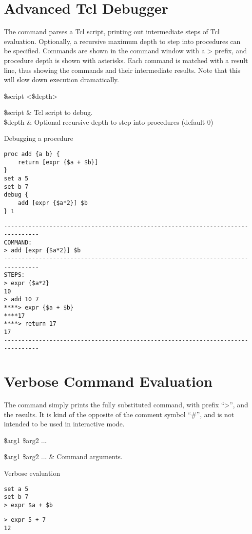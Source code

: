 \documentclass{article}
\renewcommand{\^}[1]{\textsuperscript{#1}}
\renewcommand{\_}[1]{\textsubscript{#1}}
\begin{document}
\section{Advanced Tcl Debugger}
The  command parses a Tcl script, printing out intermediate steps of Tcl evaluation. Optionally, a recursive maximum depth to step into procedures can be specified. Commands are shown in the command window with a > prefix, and procedure depth is shown with asterisks. Each command is matched with a result line, thus showing the commands and their intermediate results. Note that this will slow down execution dramatically.
\begin{syntax}
 \$script <\$depth>
\end{syntax}
\begin{args}
\$script & Tcl script to debug. \\
\$depth & Optional recursive depth to step into procedures (default 0)
\end{args}

\begin{example}{Debugging a procedure}
\begin{lstlisting}
proc add {a b} {
    return [expr {$a + $b}]
}
set a 5
set b 7
debug {
    add [expr {$a*2}] $b
} 1
\end{lstlisting}
\tcblower
\begin{lstlisting}
--------------------------------------------------------------------------------
COMMAND:
> add [expr {$a*2}] $b
--------------------------------------------------------------------------------
STEPS:
> expr {$a*2}
10
> add 10 7
****> expr {$a + $b}
****17
****> return 17
17
--------------------------------------------------------------------------------
\end{lstlisting}
\end{example}
\clearpage
\section{Verbose Command Evaluation}
The command \cmdlink{>} simply prints the fully substituted command, with prefix ``>'', and the results.
It is kind of the opposite of the comment symbol ``\#'', and is not intended to be used in interactive mode.
\begin{syntax}
\command{>} \$arg1 \$arg2 ...
\end{syntax}
\begin{args}
\$arg1 \$arg2 ... & Command arguments.
\end{args}
\begin{example}{Verbose evaluation}
\begin{lstlisting}
set a 5
set b 7
> expr $a + $b
\end{lstlisting}
\tcblower
\begin{lstlisting}
> expr 5 + 7
12
\end{lstlisting}
\end{example}
\clearpage
\end{document}
